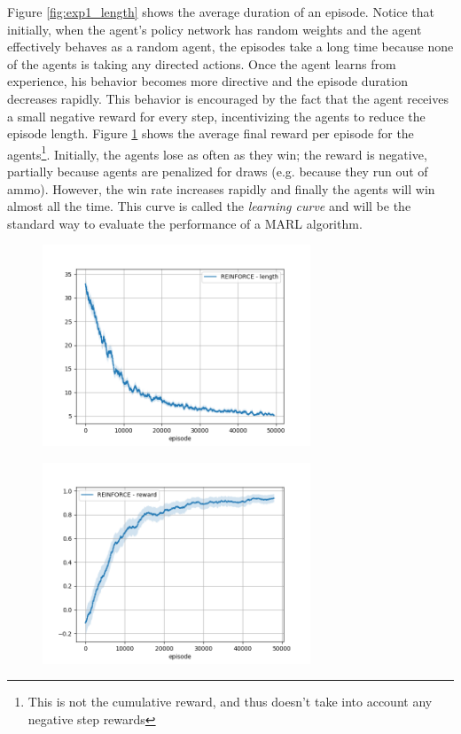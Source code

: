 Figure \ref{fig:exp1_length} shows the average duration of an episode. Notice that initially, when the agent's policy network has random weights and the agent effectively behaves as a random agent, the episodes take a long time because none of the agents is taking any directed actions. Once the agent learns from experience, his behavior becomes more directive and the episode duration decreases rapidly. This behavior is encouraged by the fact that the agent receives a small negative reward for every step, incentivizing the agents to reduce the episode length. Figure \ref{fig:exp1_reward} shows the average final reward per episode for the agents\footnote{This is not the cumulative reward, and thus doesn't take into account any negative step rewards}. Initially, the agents lose as often as they win; the reward is negative, partially because agents are penalized for draws (e.g. because they run out of ammo). However, the win rate increases rapidly and finally the agents will win almost all the time. This curve is called the \emph{learning curve} and will be the standard way to evaluate the performance of a MARL algorithm.\\
\begin{figure}
\centering
\begin{minipage}{.5\textwidth}
  \centering
  \includegraphics[width=8cm]{images/experiment4/mean_length.png}
  \label{fig:exp1_length}
\end{minipage}%
\begin{minipage}{.5\textwidth}
  \centering
  \includegraphics[width=8cm]{images/experiment4/mean_reward.png}
  \label{fig:exp1_reward}
\end{minipage}
\end{figure}

